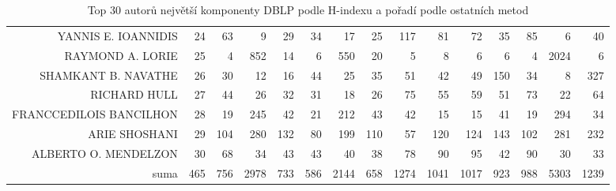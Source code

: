 \documentclass{bakalarka}
\begin{document}
\begin{table}[!ht]
\begin{sideways}
\begin{scriptsize}
\begin{tabular}{r|r|rrrrrrrrrrrrr}
YANNIS E. IOANNIDIS&24&63&9&29&34&17&25&117&81&72&35&85&6&40\\
RAYMOND A. LORIE&25&4&852&14&6&550&20&5&8&6&6&4&2024&6\\
SHAMKANT B. NAVATHE&26&30&12&16&44&25&35&51&42&49&150&34&8&327\\
RICHARD HULL&27&44&26&32&31&18&26&75&55&59&51&73&22&64\\
FRANCCEDILOIS BANCILHON&28&19&245&42&21&212&43&42&15&15&41&19&294&34\\
ARIE SHOSHANI&29&104&280&132&80&199&110&57&120&124&143&102&281&232\\
ALBERTO O. MENDELZON&30&68&34&43&43&40&38&78&90&95&42&90&30&33\\
\midrule
suma&465&756&2978&733&586&2144&658&1274&1041&1017&923&988&5303&1239\\
\bottomrule
\end{tabular}
\end{scriptsize}
\end{sideways}
\caption{Top 30 autorů největší komponenty DBLP podle H-indexu a pořadí podle ostatních metod}
\label{tab:ranks2}
\end{table}
\end{document}

